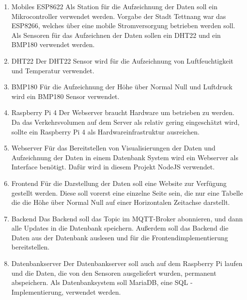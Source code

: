 \begin{enumerate}
	\item Mobiles ESP8622 \newline
	Als Station für die Aufzeichnung der Daten soll ein Mikrocontroller verwendet werden. Vorgabe der Stadt Tettnang war das ESP8266, welches über eine mobile Stromversorgung betrieben werden soll. 
	Als Sensoren für das Aufzeichnen der Daten sollen ein DHT22 und ein BMP180 verwendet werden.
	
	\item DHT22 \newline
	Der DHT22 Sensor wird für die Aufzeichnung von Luftfeuchtigkeit und Temperatur verwendet.
	
	\item BMP180 \newline
	Für die Aufzeichnung der Höhe über Normal Null und Luftdruck wird ein BMP180 Sensor verwendet.
	
	\item Raspberry Pi 4 \newline
	Der Webserver braucht Hardware um betrieben zu werden. Da das Verkehrsvolumen auf dem Server als relativ gering eingeschätzt wird, sollte ein Raspberry Pi 4 als Hardwareinfrastruktur ausreichen.
	
	\item Webserver \newline
	Für das Bereitstellen von Visualisierungen der Daten und Aufzeichnung der Daten in einem Datenbank System wird ein Webserver als Interface benötigt. Dafür wird in diesem Projekt NodeJS verwendet.
	
	\item Frontend \newline
	Für die Darstellung der Daten soll eine Website zur Verfügung gestellt werden. Diese soll vorerst eine einzelne Seite sein, die nur eine Tabelle die die Höhe über Normal Null auf einer Horizontalen Zeitachse darstellt.
	
	\item Backend \newline
	Das Backend soll das Topic im MQTT-Broker abonnieren, und dann alle Updates in die Datenbank speichern. Außerdem soll das Backend die Daten aus der Datenbank auslesen und für die Frontendimplementierung bereitstellen.
	
	\item Datenbankserver \newline
	Der Datenbankserver soll auch auf dem Raspberry Pi laufen und die Daten, die von den Sensoren ausgeliefert wurden, permanent abspeichern. Als Datenbanksystem soll MariaDB, eine SQL -Implementierung, verwendet werden.
	

\end{enumerate}
